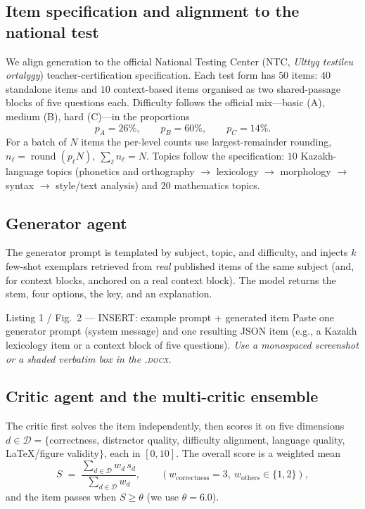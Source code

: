 \documentclass[11pt]{article}
\begin{document}
\subsection{Item specification and alignment to the national test}
We align generation to the official National Testing Center (NTC,
\emph{Ulttyq testileu ortalygy}) teacher-certification specification. Each test form has
$50$ items: $40$ standalone items and $10$ context-based items organised as two
shared-passage blocks of five questions each. Difficulty follows the official
mix---basic (A), medium (B), hard (C)---in the proportions
\[
p_A = 26\%,\qquad p_B = 60\%,\qquad p_C = 14\%.
\]
For a batch of $N$ items the per-level counts use largest-remainder rounding,
\(
n_\ell = \operatorname{round}(p_\ell N),\ \sum_\ell n_\ell = N .
\)
Topics follow the specification: $10$ Kazakh-language topics (phonetics and
orthography $\rightarrow$ lexicology $\rightarrow$ morphology $\rightarrow$
syntax $\rightarrow$ style/text analysis) and $20$ mathematics topics.

\subsection{Generator agent}
The generator prompt is templated by subject, topic, and difficulty, and
injects $k$ few-shot exemplars retrieved from \emph{real} published items of
the same subject (and, for context blocks, anchored on a real context block).
The model returns the stem, four options, the key, and an explanation.

\begin{figbox}{Listing 1 / Fig.~2 --- INSERT: example prompt + generated item}
Paste one generator prompt (system message) and one resulting JSON item
(e.g., a Kazakh lexicology item or a context block of five questions).
\emph{Use a monospaced screenshot or a shaded verbatim box in the \textsc{.docx}.}
\end{figbox}

\subsection{Critic agent and the multi-critic ensemble}
The critic first solves the item independently, then scores it on five
dimensions $d\in\mathcal D=\{$correctness, distractor quality, difficulty
alignment, language quality, \LaTeX/figure validity$\}$, each in $[0,10]$. The
overall score is a weighted mean
\begin{equation}
S \;=\; \frac{\sum_{d\in\mathcal D} w_d\, s_d}{\sum_{d\in\mathcal D} w_d},
\qquad (w_{\text{correctness}}=3,\ w_{\text{others}}\in\{1,2\}),
\label{eq:score}
\end{equation}
and the item passes when $S \ge \theta$ (we use $\theta = 6.0$).
\end{document}
